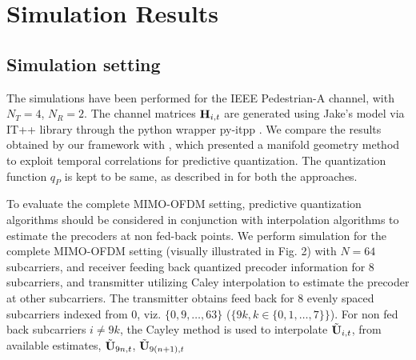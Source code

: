\documentclass[conference]{IEEEtran}
\begin{document}
{%


\section{Simulation Results}
\label{section4}

\subsection{Simulation setting}
\label{setting}

\noindent The simulations have been performed for the IEEE Pedestrian-A channel, with $N_T=4$, $N_R=2$.  The channel matrices ${\bf H}_{i,t}$ are generated using Jake's model via IT++ library through the python wrapper py-itpp \cite{ViditPy}.
We compare the results obtained by our framework with \cite{6891198}, which presented a manifold geometry method to exploit temporal correlations for predictive quantization.
The quantization function $q_P$ is kept to be same, as described in \cite{6545375,6891198,Gupt1905:Predictive} for both the approaches.

To evaluate the complete MIMO-OFDM setting, predictive quantization algorithms should be considered in conjunction with interpolation algorithms to estimate the precoders at non fed-back points.
We perform simulation for the complete MIMO-OFDM setting (visually illustrated in Fig. 2) with $N=64$ subcarriers, and receiver feeding back quantized precoder information for $8$ subcarriers, and transmitter utilizing Caley interpolation to estimate the precoder at other subcarriers. The transmitter obtains feed back for $8$ evenly spaced subcarriers indexed from 0, viz. $\{0,9,\ldots,63\}$ ($\{9k, k \in \{0,1,\ldots,7\}\}$). For non fed back subcarriers $i\neq 9k$, the Cayley method \cite{Gupt1905:Predictive} is used to interpolate $\tilde{{\bf U}}_{i,t}$, from available estimates, $\tilde{{\bf U}}_{9n,t}$, $\tilde{{\bf U}}_{9(n+1), t}$ 

}
\end{document}
